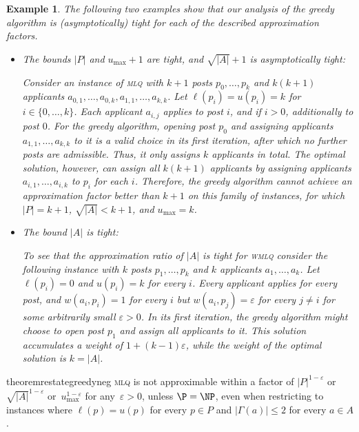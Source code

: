 \documentclass{llncs}
\newtheorem{ex}[theorem]{Example}
\begin{document}
\begin{ex}
The following two examples show that our analysis of the greedy algorithm is (asymptotically) tight for each of the described approximation factors.

\begin{itemize}
  \item[(a)] The bounds $|P|$ and $u_{\max} + 1$ are tight, and $\sqrt{|A|} + 1$ is asymptotically tight:
  
  Consider an instance of \textsc{mlq} with $k + 1$ posts $p_0, \dots, p_k$ and $k(k + 1)$ applicants $a_{0,1}, \dots, a_{0,k}, a_{1,1}, \dots, a_{k,k}$. Let $\ell(p_i) = u(p_i) = k$ for $i \in \{0, \dots, k\}$. Each applicant $a_{i,j}$ applies to post $i$, and if $i>0$, additionally to post $0$.
   For the greedy algorithm, opening post $p_0$ and assigning applicants $a_{1,1}, \dots, a_{k,k}$ to it is a valid choice in its first iteration, after which no further posts are admissible. Thus, it only assigns $k$ applicants in total. The optimal solution, however, can assign all $k(k+1)$ applicants by assigning applicants $a_{i,1}, \dots, a_{i,k}$ to $p_i$ for each $i$. Therefore, the greedy algorithm cannot achieve an approximation factor better than $k + 1$ on this family of instances, for which $|P| = k+1$, $\sqrt{|A|} < k+1$, and $u_{\max} = k$.
   
  \item[(b)] The bound $|A|$ is tight:
  
  To see that the approximation ratio of $|A|$ is  tight for \textsc{wmlq} consider the following instance with $k$ posts $p_1, \dots, p_k$ and $k$ applicants $a_1, \dots, a_k$. Let $\ell(p_i) = 0$ and $u(p_i) = k$ for every $i$. Every applicant applies for every post, and $w(a_i, p_i) = 1$ for every $i$ but $w(a_i, p_j) = \varepsilon$ for every $j \neq i$ for some arbitrarily small $\varepsilon > 0$. In its first iteration, the greedy algorithm might choose to open post $p_1$ and assign all applicants to it. This solution accumulates a weight of $1 + (k - 1)\varepsilon$, while the weight of the optimal solution is $k = |A|$.
  \end{itemize}
\end{ex}

\begin{restatable}{theorem}{restategreedyneg}
\label{th:inappr}
	\textsc{mlq} is not approximable within a factor of $|P|^{1-\varepsilon}$ or $\sqrt{|A|}^{1-\varepsilon}$ or~$u_{\max}^{1-\varepsilon}$ for any~$\varepsilon > 0$, unless $\P = \NP$, even when restricting to instances where $\ell(p) = u(p)$ for every $p \in P$ and $|\Gamma(a)| \leq 2$ for every $a \in A$.
\end{restatable}
\end{document}
